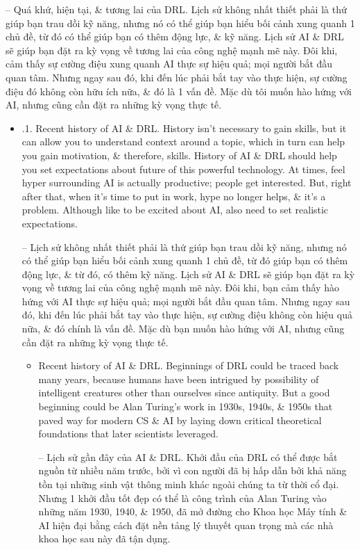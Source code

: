 \documentclass{article}
\begin{document}
\begin{itemize}
\begin{itemize}
        -- {\sf Quá khứ, hiện tại, \& tương lai của DRL.} Lịch sử không nhất thiết phải là thứ giúp bạn trau dồi kỹ năng, nhưng nó có thể giúp bạn hiểu bối cảnh xung quanh 1 chủ đề, từ đó có thể giúp bạn có thêm động lực, \& kỹ năng. Lịch sử AI \& DRL sẽ giúp bạn đặt ra kỳ vọng về tương lai của công nghệ mạnh mẽ này. Đôi khi, cảm thấy sự cường điệu xung quanh AI thực sự hiệu quả; mọi người bắt đầu quan tâm. Nhưng ngay sau đó, khi đến lúc phải bắt tay vào thực hiện, sự cường điệu đó không còn hữu ích nữa, \& đó là 1 vấn đề. Mặc dù tôi muốn hào hứng với AI, nhưng cũng cần đặt ra những kỳ vọng thực tế.
        \begin{itemize}
            \item {.1. Recent history of AI \& DRL.} History isn't necessary to gain skills, but it can allow you to understand context around a topic, which in turn can help you gain motivation, \& therefore, skills. History of AI \& DRL should help you set expectations about future of this powerful technology. At times, feel hyper surrounding AI is actually productive; people get interested. But, right after that, when it's time to put in work, hype no longer helps, \& it's a problem. Although like to be excited about AI, also need to set realistic expectations.

            -- Lịch sử không nhất thiết phải là thứ giúp bạn trau dồi kỹ năng, nhưng nó có thể giúp bạn hiểu bối cảnh xung quanh 1 chủ đề, từ đó giúp bạn có thêm động lực, \& từ đó, có thêm kỹ năng. Lịch sử AI \& DRL sẽ giúp bạn đặt ra kỳ vọng về tương lai của công nghệ mạnh mẽ này. Đôi khi, bạn cảm thấy hào hứng với AI thực sự hiệu quả; mọi người bắt đầu quan tâm. Nhưng ngay sau đó, khi đến lúc phải bắt tay vào thực hiện, sự cường điệu không còn hiệu quả nữa, \& đó chính là vấn đề. Mặc dù bạn muốn hào hứng với AI, nhưng cũng cần đặt ra những kỳ vọng thực tế.
            \begin{itemize}
                \item {\sf Recent history of AI \& DRL.} Beginnings of DRL could be traced back many years, because humans have been intrigued by possibility of intelligent creatures other than ourselves since antiquity. But a good beginning could be Alan Turing's work in 1930s, 1940s, \& 1950s that paved way for modern CS \& AI by laying down critical theoretical foundations that later scientists leveraged.

                -- {\sf Lịch sử gần đây của AI \& DRL.} Khởi đầu của DRL có thể được bắt nguồn từ nhiều năm trước, bởi vì con người đã bị hấp dẫn bởi khả năng tồn tại những sinh vật thông minh khác ngoài chúng ta từ thời cổ đại. Nhưng 1 khởi đầu tốt đẹp có thể là công trình của Alan Turing vào những năm 1930, 1940, \& 1950, đã mở đường cho Khoa học Máy tính \& AI hiện đại bằng cách đặt nền tảng lý thuyết quan trọng mà các nhà khoa học sau này đã tận dụng.


\end{itemize}
\end{itemize}
\end{itemize}
\end{itemize}
\end{document}

